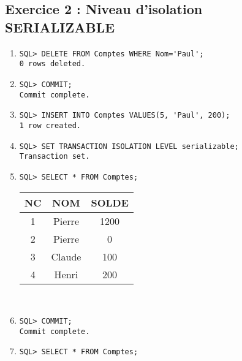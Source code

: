 \documentclass{article}
\begin{document}
\subsection*{Exercice 2 : Niveau d'isolation SERIALIZABLE}

\begin{enumerate}[label=\arabic*)]
	\item {}
		\begin{lstlisting}
SQL> DELETE FROM Comptes WHERE Nom='Paul';
0 rows deleted.
		\end{lstlisting}

	\item {}
		\begin{lstlisting}
SQL> COMMIT;
Commit complete.
		\end{lstlisting}

	\item {}
		\begin{lstlisting}
SQL> INSERT INTO Comptes VALUES(5, 'Paul', 200);
1 row created.
		\end{lstlisting}

	\item {}
		\begin{lstlisting}
SQL> SET TRANSACTION ISOLATION LEVEL serializable;
Transaction set.
		\end{lstlisting}

	\item {}
		\begin{lstlisting}
SQL> SELECT * FROM Comptes;
		\end{lstlisting}

\begin{tabular}{|c|c|c|}
	\hline
        	NC & NOM & SOLDE \\
	\hline        
 	1 & Pierre & 1200 \\
	\hline         
	2 & Pierre & 0 \\
	\hline
	3 & Claude & 100 \\
	\hline
	4 & Henri & 200 \\
	\hline
\end{tabular} \\

	\item {}
		\begin{lstlisting}
SQL> COMMIT;
Commit complete.
		\end{lstlisting}

	\item {}
		\begin{lstlisting}
SQL> SELECT * FROM Comptes;
		\end{lstlisting}


\end{enumerate}
\end{document}
